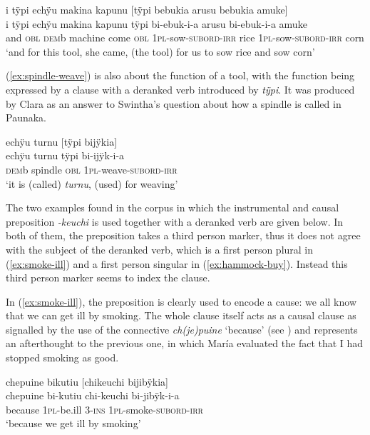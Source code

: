 \ea\label{ex:sowing-tool}
\begingl
\glpreamble i tÿpi echÿu makina kapunu \textup{[}tÿpi bebukia arusu bebukia amuke\textup{]}\\
\gla i tÿpi echÿu makina kapunu tÿpi bi-ebuk-i-a arusu bi-ebuk-i-a amuke\\
\glb and \textsc{obl} \textsc{dem}b machine come \textsc{obl} 1\textsc{pl}-sow-\textsc{subord}-\textsc{irr} rice 1\textsc{pl}-sow-\textsc{subord}-\textsc{irr} corn\\
\glft ‘and for this tool, she came, (the tool) for us to sow rice and sow corn’
\endgl
\trailingcitation{[jxx-p120515l-2.040]}
\xe

(\ref{ex:spindle-weave}) is also about the function of a tool, with the function being expressed by a clause with a deranked verb introduced by \textit{tÿpi}. It was produced by Clara as an answer to Swintha’s question about how a spindle is called in Paunaka.

\ea\label{ex:spindle-weave}
\begingl
\glpreamble echÿu turnu \textup{[}tÿpi bijÿkia\textup{]}\\
\gla echÿu turnu tÿpi bi-ijÿk-i-a\\
\glb \textsc{dem}b spindle \textsc{obl} 1\textsc{pl}-weave-\textsc{subord}-\textsc{irr}\\
\glft ‘it is (called) \textit{turnu}, (used) for weaving’
\endgl
\trailingcitation{[cux-120410ls.189-190]}
\xe




The two examples found in the corpus in which the instrumental and causal preposition \textit{-keuchi} is used together with a deranked verb are given below. In both of them, the preposition takes a third person marker, thus it does not agree with the subject of the deranked verb, which is a first person plural in (\ref{ex:smoke-ill}) and a first person singular in (\ref{ex:hammock-buy}). Instead this third person marker seems to index the clause.

In (\ref{ex:smoke-ill}), the preposition is clearly used to encode a cause: we all know that we can get ill by smoking. The whole clause itself acts as a causal clause as signalled by the use of the connective \textit{ch(je)puine} ‘because’ (see ) and represents an afterthought to the previous one, in which María evaluated the fact that I had stopped smoking as good.

\ea\label{ex:smoke-ill}
\begingl
\glpreamble chepuine bikutiu \textup{[}chikeuchi bijibÿkia\textup{]}\\
\gla chepuine bi-kutiu chi-keuchi bi-jibÿk-i-a\\
\glb because 1\textsc{pl}-be.ill 3-\textsc{ins} 1\textsc{pl}-smoke-\textsc{subord}-\textsc{irr}\\
\glft ‘because we get ill by smoking’
\endgl
\trailingcitation{[rxx-e120511l.384]}
\xe

